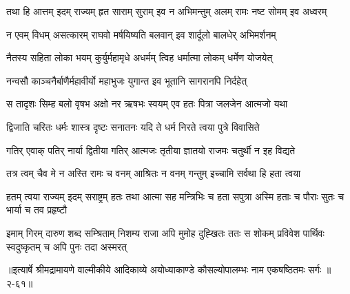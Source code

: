 \twolineshloka
{तथा हि आत्तम् इदम् राज्यम् हृत साराम् सुराम् इव}
{न अभिमन्तुम् अलम् रामः नष्ट सोमम् इव अध्वरम्} %

\twolineshloka
{न एवम् विधम् असत्कारम् राघवो मर्षयिष्यति}
{बलवान् इव शार्दूलो बालधेर् अभिमर्शनम्} %

\twolineshloka
{नैतस्य सहिता लोका भयम् कुर्युर्महामृधे}
{अधर्मम् त्विह धर्मात्मा लोकम् धर्मेण योजयेत्} %

\twolineshloka
{नन्वसौ काञ्चनैर्बाणैर्महावीर्यो महाभुजः}
{युगान्त इव भूतानि सागरानपि निर्दहेत्} %

\twolineshloka
{स तादृशः सिम्ह बलो वृषभ अक्षो नर ऋषभः}
{स्वयम् एव हतः पित्रा जलजेन आत्मजो यथा} %

\twolineshloka
{द्विजाति चरितः धर्मः शास्त्र दृष्टः सनातनः}
{यदि ते धर्म निरते त्वया पुत्रे विवासिते} %

\twolineshloka
{गतिर् एवाक् पतिर् नार्या द्वितीया गतिर् आत्मजः}
{तृतीया ज्ञातयो राजमः चतुर्थी न इह विद्यते} %

\twolineshloka
{तत्र त्वम् चैव मे न अस्ति रामः च वनम् आश्रितः}
{न वनम् गन्तुम् इच्चामि सर्वथा हि हता त्वया} %

\fourlineindentedshloka
{हतम् त्वया राज्यम् इदम् सराष्ट्रम्}
{हतः तथा आत्मा सह मन्त्रिभिः च}
{हता सपुत्रा अस्मि हताः च पौराः}
{सुतः च भार्या च तव प्रहृष्टौ} %

\fourlineindentedshloka
{इमाम् गिरम् दारुण शब्द सम्श्रिताम्}
{निशम्य राजा अपि मुमोह दुह्खितः}
{ततः स शोकम् प्रविवेश पार्थिवः}
{स्वदुष्कृतम् च अपि पुनः तदा अस्मरत्} %


॥इत्यार्षे श्रीमद्रामायणे वाल्मीकीये आदिकाव्ये अयोध्याकाण्डे कौसल्योपालम्भः नाम एकषष्ठितमः सर्गः ॥२-६१॥

